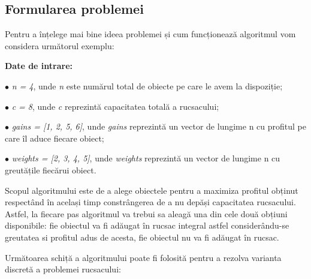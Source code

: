 \begin{sloppypar}
\subsection*{Formularea problemei}
Pentru a înțelege mai bine ideea problemei și cum funcționează algoritmul vom considera următorul exemplu:
\begin{textbox}
\textbf{Date de intrare:} \par
$\bullet$ \textit{n = 4}, unde \textit{n} este numărul total de obiecte pe care le avem la dispoziție; \par
$\bullet$ \textit{c = 8}, unde \textit{c} reprezintă capacitatea totală a rucsacului; \par
$\bullet$ \textit{gains = [1, 2, 5, 6]}, unde \textit{gains} reprezintă un vector de lungime n cu profitul pe care îl aduce fiecare obiect; \par
$\bullet$ \textit{weights = [2, 3, 4, 5]}, unde \textit{weights} reprezintă un vector de lungime n cu greutățile fiecărui obiect.
\end{textbox}

Scopul algoritmului este de a alege obiectele pentru a maximiza profitul obținut respectând în același timp constrângerea de a nu depăși capacitatea rucsacului. Astfel, la fiecare pas algoritmul va trebui sa aleagă una din cele două obțiuni disponibile: fie obiectul va fi adăugat în rucsac integral astfel considerându-se greutatea si profitul adus de acesta, fie obiectul nu va fi adăugat în rucsac. \par
Următoarea schiță a algoritmului poate fi folosită pentru a rezolva varianta discretă a problemei rucsacului:


\end{sloppypar}
